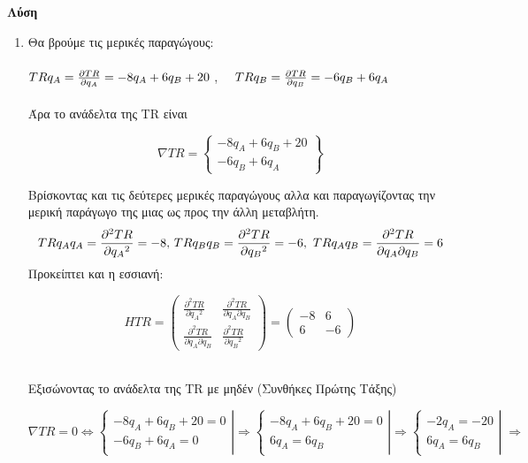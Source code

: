 \documentclass[12pt,a4paper]{article}
\begin{document}
\textbf{Λύση}\\
\begin{enumerate}
\item Θα βρούμε τις μερικές παραγώγους: \\\\
 
$TR{q_A} = {{\partial TR} \over {\partial {q_A}}} =  - 8{q_A} + 6{q_B} + 20$ , \ \  
$TR{q_B} = {{\partial TR} \over {\partial {q_B}}} =  - 6{q_B} + 6{q_A}$\\\\

Άρα το ανάδελτα της \textlatin{TR} είναι 

\[\nabla TR = \left\{ {\begin{array}{*{20}{c}}
{ - 8{q_A} + 6{q_B} + 20}\\
{ - 6{q_B} + 6{q_A}}
\end{array}} \right\}\]

Βρίσκοντας και τις δεύτερες μερικές παραγώγους αλλα και παραγωγίζοντας την μερική παράγωγο της μιας ως προς την άλλη μεταβλήτη. \\
\[TR{q_A}{q_A} = \frac{{{\partial ^2}TR}}{{\partial {q_A}^2}} =  - 8{\rm{ }}{\rm{, \       }}TR{q_B}{q_B} = \frac{{{\partial ^2}TR}}{{\partial {q_B}^2}} =  - 6, \ {\rm{      }}TR{q_A}{q_B} = \frac{{{\partial ^2}TR}}{{\partial {q_A}\partial {q_B}}} = 6\]
Προκείπτει και η εσσιανή:

\[HTR = \left( {\begin{array}{*{20}{c}}
{\frac{{{\partial ^2}TR}}{{\partial {q_A}^2}}}&{\frac{{{\partial ^2}TR}}{{\partial {q_A}\partial {q_B}}}}\\
{\frac{{{\partial ^2}TR}}{{\partial {q_A}\partial {q_B}}}}&{\frac{{{\partial ^2}TR}}{{\partial {q_B}^2}}}
\end{array}} \right) = \left( {\begin{array}{*{20}{c}}
{ - 8}&6\\
6&{ - 6}
\end{array}} \right)\] \\

\begin{center}
Εξισώνοντας το ανάδελτα της \textlatin{TR} με μηδέν (Συνθήκες Πρώτης Τάξης)
\end{center}

\[\nabla TR = 0 \Leftrightarrow \left\{ {\left. {\begin{array}{*{20}{c}}
{ - 8{q_A} + 6{q_B} + 20 = 0}\\
{ - 6{q_B} + 6{q_A} = 0}
\end{array}} \right|} \right. \Rightarrow \left\{ {\left. {\begin{array}{*{20}{c}}
{ - 8{q_A} + 6{q_B} + 20 = 0}\\
{6{q_A} = 6{q_B}}
\end{array}} \right|} \right. \Rightarrow \left\{ {\left. {\begin{array}{*{20}{c}}
{ - 2{q_A} =  - 20}\\
{6{q_A} = 6{q_B}}
\end{array}} \right|} \right.\; \Rightarrow \]



\end{enumerate}
\end{document}
